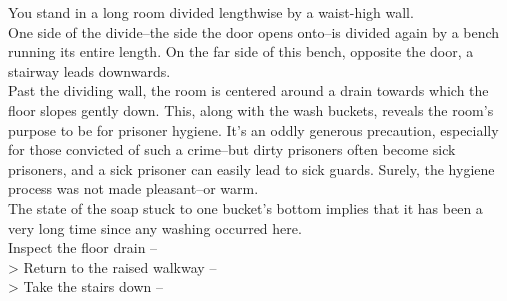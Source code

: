 You stand in a long room divided lengthwise by a waist-high wall.\\

One side of the divide--the side the door opens onto--is divided again by a bench running its entire length. On the far side of this bench, opposite the door, a stairway leads downwards.\\

Past the dividing wall, the room is centered around a drain towards which the floor slopes gently down. This, along with the wash buckets, reveals the room’s purpose to be for prisoner hygiene. It’s an oddly generous precaution, especially for those convicted of such a crime--but dirty prisoners often become sick prisoners, and a sick prisoner can easily lead to sick guards. Surely, the hygiene process was not made pleasant--or warm.\\

The state of the soap stuck to one bucket’s bottom implies that it has been a very long time since any washing occurred here.\\

 Inspect the floor drain -- \\
> Return to the raised walkway -- \\
> Take the stairs down -- 